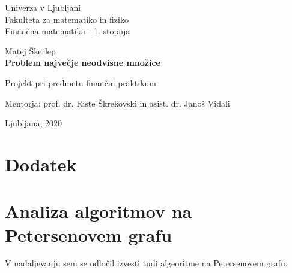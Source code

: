 \documentclass[a4paper, 12 pt]{article}
\theoremstyle{definition}
\theoremstyle{plain}
\theoremstyle{remark}
\begin{document}
\begin{titlepage}
		\begin{center}
		
		\large
		Univerza v Ljubljani\\
		\normalsize
		Fakulteta za matematiko in fiziko\\
		
		\small
		Finančna matematika - 1. stopnja\\
		
		\vspace{5 cm} 
		
		\large
		Matej Škerlep \\
		
		\vspace{0.5cm}
		\LARGE
		\textbf{Problem največje neodvisne množice}
		
		\vspace{0.5 cm}
		\normalsize
		Projekt pri predmetu finančni praktikum
		
		\vspace{1.5cm}
		\normalsize
		Mentorja: prof. dr. Riste Škrekovski in asist. dr. Janoš Vidali
		
		\vfill
		
		\large Ljubljana, 2020
		
		\end{center}
\end{titlepage}
\tableofcontents

\listoffigures

\listoftables
\newpage
\section{Dodatek} %

\section{Analiza algoritmov na Petersenovem grafu}
V nadaljevanju sem se odločil izvesti tudi algeoritme na Petersenovem grafu.
\end{document}
